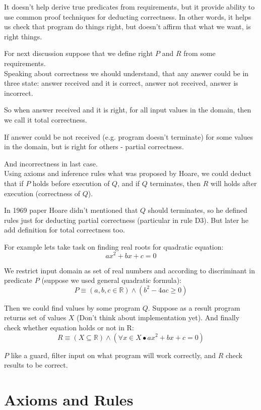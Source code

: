 \documentclass[twoside,twocolumn]{article}
\begin{document}
It doesn't help derive true predicates from requirements, but it
provide ability to use common proof techniques for deducting correctness.
In other words, it helps us check that program do things right, but doesn't
affirm that what we want, is right things.

For next discussion suppose that we define right $P$ and $R$ from some
requirements. \\

Speaking about correctness we should understand, that any answer could be in
three state: answer received and it is correct, answer not received, answer is
incorrect.  

So when answer received and it is right, for all input values in the domain,
then we call it total correctness.

If answer could be not received (e.g. program doesn't terminate) for some values
in the domain, but is right for others - partial correctness.

And incorrectness in last case. \\

Using axioms and inference rules what was proposed by Hoare, we could deduct
that if $P$ holds before execution of $Q$, and if $Q$ terminates, then $R$ will
holds after execution (correctness of $Q$).

In 1969 paper Hoare didn't mentioned that $Q$ should terminates, so he defined
rules just for deducting partial correctness (particular in rule D3). But later
he add definition for total correctness too.

For example lets take task on finding real roots for quadratic equation:
$$ ax^2 + bx + c = 0$$

We restrict input domain as set of real numbers and according to discriminant in
predicate $P$ (suppose we used general quadratic formula):
$$ P \equiv (a, b, c \in \mathbb{R}) \wedge (b^2 - 4ac \geq 0)$$

Then we could find values by some program $Q$. Suppose as a result program
returns set of values $X$ (Don't think about implementation yet).
And finally check whether equation holds or not in R: 
$$ R \equiv (X \subseteq \mathbb{R}) \wedge (\forall x \in X \bullet ax^2 + bx + c
= 0)$$

$P$ like a guard, filter input on what program will work correctly, and $R$
check results to be correct. 

\section{Axioms and Rules}
\end{document}
